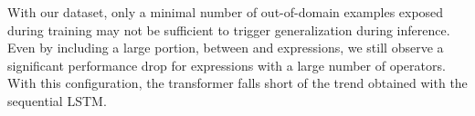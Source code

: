 With our dataset, only a minimal number of out-of-domain examples exposed during training may not be sufficient to trigger generalization during inference. Even by including a large portion, between  and  expressions, we still observe a significant performance drop for expressions with a large number of operators. With this configuration, the transformer falls short of the trend obtained with the sequential LSTM.









